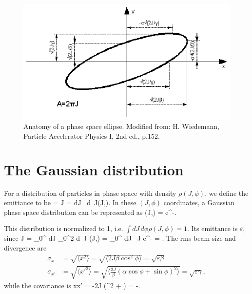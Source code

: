 \begin{figure}[htp]
	\centering \includegraphics[scale=0.75]{phaseellipse.eps}
	\caption{Anatomy of a phase space ellipse.  Modified from: H. Wiedemann, Particle Accelerator Physics I, 2nd ed., p.152.}
	\label{fig:ellipse}
\end{figure}

\section{The Gaussian distribution}
For a distribution of particles in phase space with density $\rho(J,\phi)$, we define the emittance to be
\Begineq
	\varepsilon = \langle J \rangle = \int dJ \, d\phi \, J\rho(J,\phi).
\Endeq
In these $(J,\phi)$ coordinates, a Gaussian phase space distribution can be represented as
\Begineq
	\rho(J,\phi) =  e^{-}.
	\label{eq:rho}
\Endeq

This distribution is normalized to 1, i.e. $\int dJ \, d\phi \rho(J,\phi) = 1$.  Its emittance is $\varepsilon$, since
\Begineq
	\langle J \rangle = \int_{0}^{\infty} dJ \int_{0}^{2\pi} d\phi \, J \rho(J,\phi) =  \int_{0}^{\infty} dJ \, J e^{-} = \varepsilon.
\Endeq
The rms beam size and divergence are
\begin{align}
	\sigma_x & = \sqrt{\langle x^2 \rangle} = \sqrt{\langle 2J\beta \cos^2 \phi \rangle} = \sqrt{\varepsilon\beta}  \\
	\sigma_{x'} & = \sqrt{\langle x'^2 \rangle} = \sqrt{\biggl\langle \frac{2J}{\beta} (\alpha \cos\phi + \sin\phi)^2 \biggr\rangle} = \sqrt{\varepsilon\gamma},
	\label{eq:rms}
\end{align}
while the covariance is
\Begineq
	\langle xx' \rangle = \langle -2J (\alpha \cos^2 \phi + \sin\phi \cos\phi) \rangle = -\varepsilon\alpha.
	\label{eq:corr}
\Endeq

